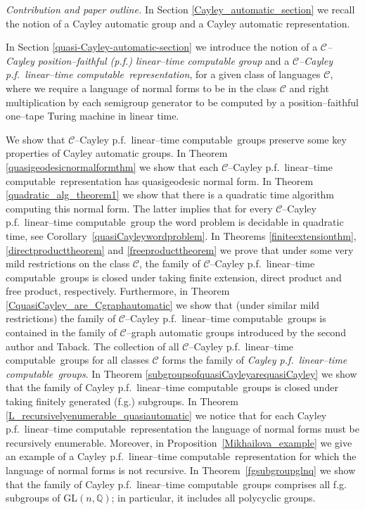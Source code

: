 \documentclass[article,12pt]{elsarticle}
\newcommand\ClinearC{$\mathcal{C}$--Cayley p.f.~linear--time computable}
\newcommand\linearC{Cayley p.f.~linear--time computable}
\begin{document}
{\it Contribution and paper outline.} 
In Section \ref{Cayley_automatic_section} we recall 
the notion of  
a Cayley automatic group 
and a Cayley automatic representation.   

In Section \ref{quasi-Cayley-automatic-section} 
we introduce the notion of a 
\emph{ $\mathcal{C}$--Cayley 
	 position--faithful (p.f.) 
	 linear--time 
	 computable  
 group} and 
a \emph{\ClinearC\
representation},
for a given class of languages $\mathcal{C}$, where we require a language of normal forms to 
be in the class $\mathcal{C}$ and 
 right multiplication by each semigroup 
generator to be computed by a 
position--faithful  one--tape Turing machine 
in linear time. 

We show that  
\ClinearC\
groups preserve some key properties of 
Cayley automatic groups. 
In Theorem 
\ref{quasigeodesicnormalformthm} we show that 
each \ClinearC\
representation has quasigeodesic normal form.  
In Theorem \ref{quadratic_alg_theorem1} we show that 
there is a quadratic time algorithm  
computing this normal form. The latter implies that
for every
\ClinearC\  
group the word problem is decidable in quadratic time, 
see Corollary~\ref{quasiCayleywordproblem}.
In Theorems \ref{finiteextensionthm}, \ref{directproducttheorem} and 
\ref{freeproducttheorem}
we prove that under some very mild restrictions on the class $\mathcal{C}$, the family of \ClinearC\
 groups is closed under taking 
 finite extension, direct product
and  free product, respectively.
Furthermore, in Theorem \ref{CquasiCayley_are_Cgraphautomatic}
we show that (under similar mild restrictions) the family of \ClinearC\ groups is contained in the family of $\mathcal{C}$--graph automatic 
groups introduced by the second author and Taback. 
The collection of all 
\ClinearC\
groups for all classes $\mathcal{C}$ 
forms the family of \emph{\linearC\ groups}.  
In Theorem \ref{subgroupsofquasiCayleyarequasiCayley} 
we show that the family of \linearC\ 
groups
is closed under taking 
finitely generated (f.g.) subgroups. In Theorem 
\ref{L_recursivelyenumerable_quasiautomatic} 
we notice that for each 
\linearC\ 
representation the language of normal forms 
must be recursively enumerable. Moreover, 
in Proposition~\ref{Mikhailova_example} we give 
an example of a \linearC\ 
representation for which the language of
normal forms is not recursive.  
In Theorem~\ref{fgsubgroupglnq} we show that 
the family of \linearC\ groups comprises 
all f.g. subgroups of $\mathrm{GL}(n,\mathbb{Q})$; 
in particular, it includes all polycyclic groups.  
\end{document}
